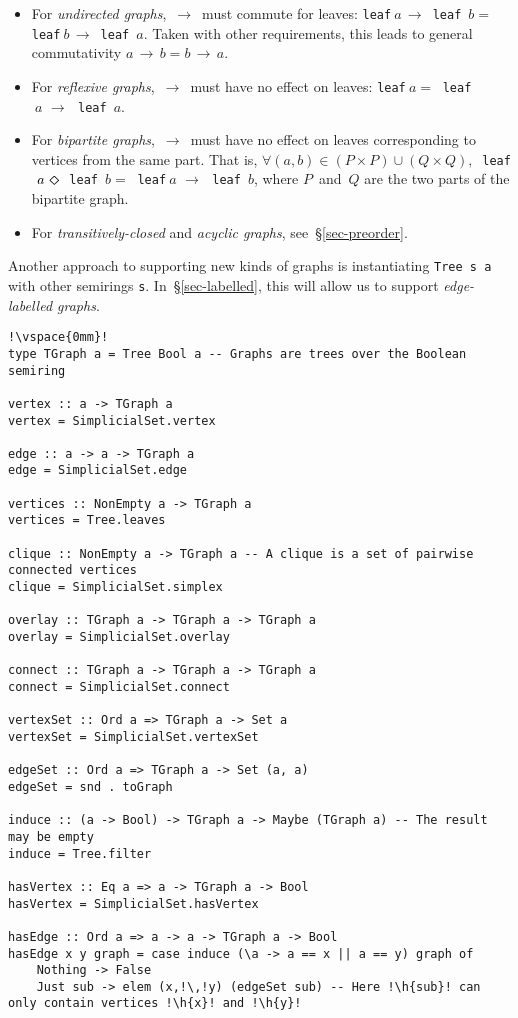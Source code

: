 \documentclass[crc,english]{programming}
\newcommand{\code}[1]{\lstinline[mathescape]|#1|}
\newcommand{\hcode}[1]{{\color{darkblue} \lstinline[keywordstyle={}]|#1|}} %
\newcommand{\h}[1]{{\itshape\color{grayblue}#1}} %
\newcommand{\dia}{\,\text{\raisebox{-0.3mm}{\Large $\diamond$}}\,}
\newcommand{\arr}{\,\text{$\rightarrow$}\,}
\begin{document}
\begin{itemize}
    \item For \emph{undirected graphs}, $\arr$ must commute for leaves:
    \hcode{leaf}$~a \arr $\hcode{leaf}~$b =~$\hcode{leaf}$~b \arr $\hcode{leaf}~$a$.
    Taken with other requirements, this leads to general commutativity
    $a \arr b = b \arr a$.
    \item For \emph{reflexive graphs}, $\arr$ must have no effect on leaves:
    \hcode{leaf}$~a =~$\hcode{leaf}$~a\,\arr\,$\hcode{leaf}~$a$.
    \item For \emph{bipartite graphs}, $\arr$ must have no effect on leaves
    corresponding to vertices from the same part. That is,
    $\forall (a,b) \in (P \times P) \cup (Q \times Q),\ $\hcode{leaf}$~a\,\dia\,$\hcode{leaf}~$b =~$\hcode{leaf}$~a\,\arr\,$\hcode{leaf}~$b$,
    where $P$~and~$Q$ are the two parts of the bipartite graph.
    \item For \emph{transitively-closed} and \emph{acyclic graphs},
    see~\S\ref{sec-preorder}.
\end{itemize}

\noindent
Another approach to supporting new kinds of graphs is instantiating
\hcode{Tree s a} with other semirings \hcode{s}. In~\S\ref{sec-labelled}, this
will allow us to support \emph{edge-labelled graphs}.

\begin{lstlisting}[float,label=lst-graph,xleftmargin=0pt,caption={
    Implementing a part of the \code{Algebra.G}\code{raph} API~\cite{mokhov_alga}
    with \hcode{Tree Bool a}.
},captionpos=t]
!\vspace{0mm}!
type TGraph a = Tree Bool a -- Graphs are trees over the Boolean semiring

vertex :: a -> TGraph a
vertex = SimplicialSet.vertex

edge :: a -> a -> TGraph a
edge = SimplicialSet.edge

vertices :: NonEmpty a -> TGraph a
vertices = Tree.leaves

clique :: NonEmpty a -> TGraph a -- A clique is a set of pairwise connected vertices
clique = SimplicialSet.simplex

overlay :: TGraph a -> TGraph a -> TGraph a
overlay = SimplicialSet.overlay

connect :: TGraph a -> TGraph a -> TGraph a
connect = SimplicialSet.connect

vertexSet :: Ord a => TGraph a -> Set a
vertexSet = SimplicialSet.vertexSet

edgeSet :: Ord a => TGraph a -> Set (a, a)
edgeSet = snd . toGraph

induce :: (a -> Bool) -> TGraph a -> Maybe (TGraph a) -- The result may be empty
induce = Tree.filter

hasVertex :: Eq a => a -> TGraph a -> Bool
hasVertex = SimplicialSet.hasVertex

hasEdge :: Ord a => a -> a -> TGraph a -> Bool
hasEdge x y graph = case induce (\a -> a == x || a == y) graph of
    Nothing -> False
    Just sub -> elem (x,!\,!y) (edgeSet sub) -- Here !\h{sub}! can only contain vertices !\h{x}! and !\h{y}!
\end{lstlisting}
\end{document}
